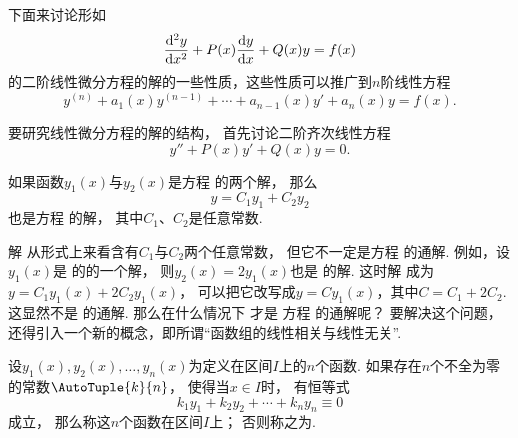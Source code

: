 下面来讨论形如
\begin{equation}\label{equation:微分方程.二阶非齐次线性微分方程的一般形式}
	\dv[2]{y}{x} + P(x) \dv{y}{x} + Q(x) y = f(x)
\end{equation}
的二阶线性微分方程的解的一些性质，这些性质可以推广到\(n\)阶线性方程
\begin{equation}\label{equation:微分方程.n阶线性微分方程的一般形式}
	y^{(n)} + a_1(x) y^{(n-1)} + \dotsb + a_{n-1}(x) y' + a_n(x) y = f(x).
\end{equation}

要研究线性微分方程的解的结构，
首先讨论二阶齐次线性方程\begin{equation}\label{equation:微分方程.二阶齐次线性微分方程的一般形式}
	y'' + P(x) y' + Q(x) y = 0.
\end{equation}

\begin{theorem}
如果函数\(y_1(x)\)与\(y_2(x)\)是方程  的两个解，
那么\begin{equation}\label{equation:微分方程.二阶齐次线性微分方程的通解的结构}
	y = C_1 y_1 + C_2 y_2
\end{equation}
也是方程  的解，
其中\(C_1\)、\(C_2\)是任意常数.
\end{theorem}

解  从形式上来看含有\(C_1\)与\(C_2\)两个任意常数，
但它不一定是方程  的通解.
例如，设\(y_1(x)\)是  的的一个解，
则\(y_2(x)=2 y_1(x)\)也是  的解.
这时解  成为\(y = C_1 y_1(x) + 2 C_2 y_1(x)\)，
可以把它改写成\(y = C y_1(x)\)，其中\(C = C_1 + 2 C_2\).
这显然不是  的通解.
那么在什么情况下  才是%
方程  的通解呢？
要解决这个问题，还得引入一个新的概念，即所谓“函数组的线性相关与线性无关”.

\begin{definition}
设\(y_1(x),y_2(x),\dotsc,y_n(x)\)为定义在区间\(I\)上的\(n\)个函数.
如果存在\(n\)个不全为零的常数\(\AutoTuple{k}{n}\)，
使得当\(x \in I\)时，
有恒等式\[
	k_1 y_1+k_2 y_2+ \dotsb +k_n y_n \equiv 0
\]成立，
那么称这\(n\)个函数在区间\(I\)上；
否则称之为.
\end{definition}

